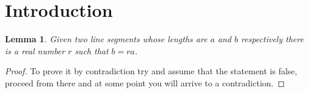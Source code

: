 \documentclass{article}
\newtheorem{lemma}[theorem]{Lemma}
\begin{document}
\section{Introduction}
\begin{lemma}
Given two line segments whose lengths are \(a\) and \(b\) respectively there 
is a real number \(r\) such that \(b=ra\).
\end{lemma}

\begin{proof}
To prove it by contradiction try and assume that the statement is false,
proceed from there and at some point you will arrive to a contradiction.
\end{proof}
\end{document}
